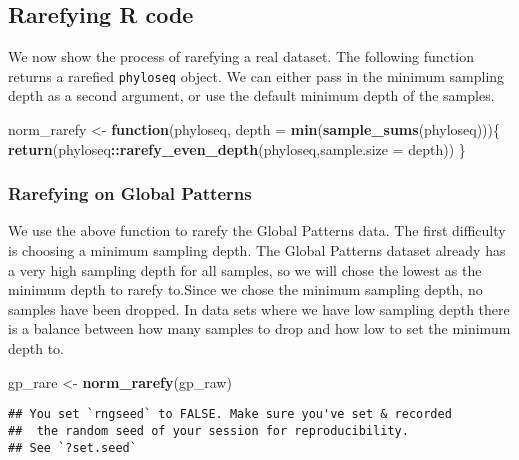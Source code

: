 \documentclass[
]{book}
\newenvironment{Shaded}{\begin{snugshade}}{\end{snugshade}}
\newcommand{\ControlFlowTok}[1]{\textcolor[rgb]{0.13,0.29,0.53}{\textbf{#1}}}
\newcommand{\DataTypeTok}[1]{\textcolor[rgb]{0.13,0.29,0.53}{#1}}
\newcommand{\KeywordTok}[1]{\textcolor[rgb]{0.13,0.29,0.53}{\textbf{#1}}}
\newcommand{\NormalTok}[1]{#1}
\newcommand{\OperatorTok}[1]{\textcolor[rgb]{0.81,0.36,0.00}{\textbf{#1}}}
\newcommand{\StringTok}[1]{\textcolor[rgb]{0.31,0.60,0.02}{#1}}
\begin{document}
\hypertarget{rarefying-r-code}{%
\subsection{Rarefying R code}\label{rarefying-r-code}}

We now show the process of rarefying a real dataset. The following function returns a rarefied \texttt{phyloseq} object. We can either pass in the minimum sampling depth as a second argument, or use the default minimum depth of the samples.

\begin{Shaded}
\begin{Highlighting}[]
\NormalTok{norm\_rarefy \textless{}{-}}\StringTok{ }\ControlFlowTok{function}\NormalTok{(phyloseq, }\DataTypeTok{depth =} \KeywordTok{min}\NormalTok{(}\KeywordTok{sample\_sums}\NormalTok{(phyloseq)))\{}
    \KeywordTok{return}\NormalTok{(phyloseq}\OperatorTok{::}\KeywordTok{rarefy\_even\_depth}\NormalTok{(phyloseq,}\DataTypeTok{sample.size =}\NormalTok{ depth))}
\NormalTok{\}}
\end{Highlighting}
\end{Shaded}

\hypertarget{rarefying-on-global-patterns}{%
\subsubsection{Rarefying on Global Patterns}\label{rarefying-on-global-patterns}}

We use the above function to rarefy the Global Patterns data. The first difficulty is choosing a minimum sampling depth. The Global Patterns dataset already has a very high sampling depth for all samples, so we will chose the lowest as the minimum depth to rarefy to.Since we chose the minimum sampling depth, no samples have been dropped. In data sets where we have low sampling depth there is a balance between how many samples to drop and how low to set the minimum depth to.

\begin{Shaded}
\begin{Highlighting}[]
\NormalTok{gp\_rare \textless{}{-}}\StringTok{ }\KeywordTok{norm\_rarefy}\NormalTok{(gp\_raw)}
\end{Highlighting}
\end{Shaded}

\begin{verbatim}
## You set `rngseed` to FALSE. Make sure you've set & recorded
##  the random seed of your session for reproducibility.
## See `?set.seed`
\end{verbatim}
\end{document}
